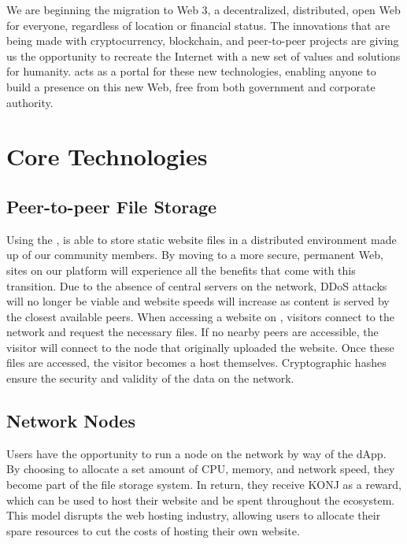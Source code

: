 \documentclass{kwp-builder}
\begin{document}
We are beginning the migration to Web 3, a decentralized, distributed, open Web for everyone, regardless of location or financial status. The innovations that are being made with cryptocurrency, blockchain, and peer-to-peer projects are giving us the opportunity to recreate the Internet with a new set of values and solutions for humanity. \konjure acts as a portal for these new technologies, enabling anyone to build a presence on this new Web, free from both government and corporate authority.



\section{Core Technologies}
\subsection{Peer-to-peer File Storage}

\tab Using the , \konjure is able to store static website files in a distributed environment made up of our community members. By moving to a more secure, permanent Web, sites on our platform will experience all the benefits that come with this transition. Due to the absence of central servers on the network, DDoS attacks will no longer be viable and website speeds will increase as content is served by the closest available peers. When accessing a website on \konjure, visitors connect to the network and request the necessary files. If no nearby peers are accessible, the visitor will connect to the node that originally uploaded the website. Once these files are accessed, the visitor becomes a host themselves. Cryptographic hashes ensure the security and validity of the data on the network.

\subsection{Network Nodes}


\tab Users have the opportunity to run a node on the \konjure network by way of the \konjure dApp. By choosing to allocate a set amount of CPU, memory, and network speed, they become part of the file storage system. In return, they receive KONJ\kkonj{} as a reward, which can be used to host their website and be spent throughout the ecosystem. This model disrupts the web hosting industry, allowing users to allocate their spare resources to cut the costs of hosting their own website.
\end{document}
